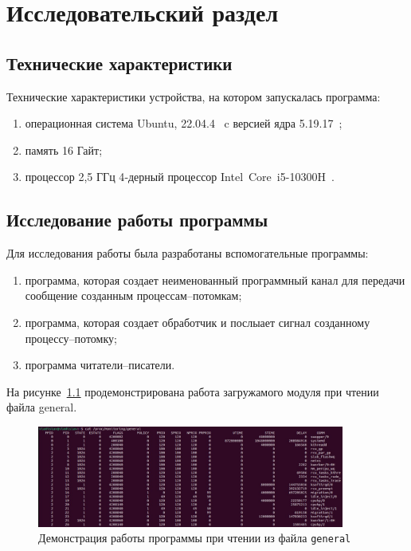 \chapter{Исследовательский раздел}

\section{Технические характеристики}

Технические характеристики устройства, на котором запускалась программа:

\begin{enumerate}
	\item операционная система Ubuntu, 22.04.4~\cite{ubuntu} c версией ядра 5.19.17~\cite{};
	\item память 16 Гайт;
	\item процессор 2,5 ГГц 4‑дерный процессор Intel Core i5-10300H~\cite{intel}.
\end{enumerate}

\section{Исследование работы программы}

Для исследования работы была разработаны вспомогательные программы:
\begin{enumerate}
	\item программа, которая создает неименованный программный канал для передачи сообщение созданным процессам--потомкам;
	\item программа, которая создает обработчик и послыает сигнал созданному процессу--потомку;
	\item программа читатели--писатели.
\end{enumerate}

На рисунке~\ref{img:exmaple-general} продемонстрирована работа загружамого модуля при чтении файла general.

\begin{figure}[h]
	\centering
	\includegraphics[width=0.9\textwidth]{img/example-general}
	\caption{Демонстрация работы программы при чтении из файла \texttt{general}}
	\label{img:exmaple-general}
\end{figure}


